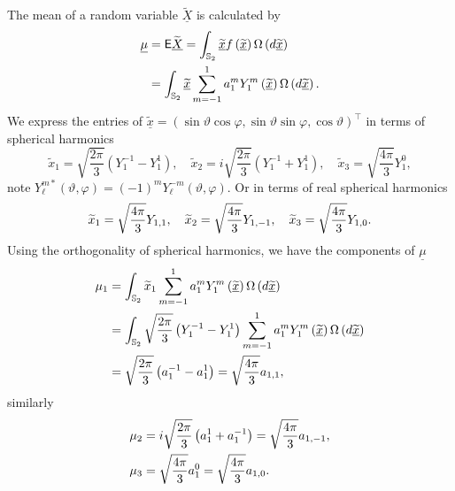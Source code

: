 \documentclass[preprint,11pt,a4paper]{elsarticle}
\begin{document}
The mean of a random variable $\widetilde{\underline{X}}$ is calculated by 
\begin{align}
\underline{\mu} & =\mathsf{E}\widetilde{\underline{X}}=\int_{\mathbb{S}_{2}}%
\underline{\widetilde{x}}f\left( \underline{\widetilde{x}}\right)
\Omega\left( d\underline{\widetilde{x}}\right)  \label{Mean_Dir} \\
& =\int_{\mathbb{S}_{2}}\underline{\widetilde{x}}%
\sum_{m=-1}^{1}a_{1}^{m}Y_{1}^{m}\left( \underline{\widetilde{x}}\right)
\Omega\left( d\underline{\widetilde{x}}\right) .  \notag
\end{align}
We express the entries of $\underline{\widetilde{x}}=\left( \sin\vartheta
\cos\varphi,\sin\vartheta\sin\varphi,\cos\vartheta\right) ^{\top}$ in terms
of spherical harmonics 
\begin{equation}
\widetilde{x}_{1}=\sqrt{\frac{2\pi}{3}}\left( Y_{1}^{-1}-Y_{1}^{1}\right)
,\quad\widetilde{x}_{2}=i\sqrt{\frac{2\pi}{3}}\left(
Y_{1}^{-1}+Y_{1}^{1}\right) ,\quad\widetilde{x}_{3}=\sqrt{\frac{4\pi}{3}}%
Y_{1}^{0},  \label{coord2Sph}
\end{equation}
note $Y_{\ell}^{m\ast}\left( \vartheta,\varphi\right) =\left( -1\right)
^{m}Y_{\ell}^{-m}\left( \vartheta,\varphi\right) $. Or in terms of real
spherical harmonics 
\begin{equation*}
\widetilde{x}_{1}=\sqrt{\frac{4\pi}{3}}Y_{1,1},\quad\widetilde{x}_{2}=\sqrt{%
\frac{4\pi}{3}}Y_{1,-1},\quad\widetilde{x}_{3}=\sqrt{\frac{4\pi}{3}}Y_{1,0}.
\end{equation*}
Using the orthogonality of spherical harmonics, we have the components of $%
\underline{\mu}$ 
\begin{align}
\mu_{1} & =\int_{\mathbb{S}_{2}}\widetilde{x}_{1}%
\sum_{m=-1}^{1}a_{1}^{m}Y_{1}^{m}\left( \underline{\widetilde{x}}\right)
\Omega\left( d\underline{\widetilde{x}}\right)  \notag \\
& =\int_{\mathbb{S}_{2}}\sqrt{\frac{2\pi}{3}}\left(
Y_{1}^{-1}-Y_{1}^{1}\right) \sum_{m=-1}^{1}a_{1}^{m}Y_{1}^{m}\left( 
\underline{\widetilde{x}}\right) \Omega\left( d\underline{\widetilde{x}}%
\right)  \notag \\
& =\sqrt{\frac{2\pi}{3}}\left( a_{1}^{-1}-a_{1}^{1}\right) =\sqrt {\frac{4\pi%
}{3}}a_{1,1},  \label{Mu1}
\end{align}
similarly 
\begin{align}
\mu_{2} & =i\sqrt{\frac{2\pi}{3}}\left( a_{1}^{1}+a_{1}^{-1}\right) =\sqrt{%
\frac{4\pi}{3}}a_{1,-1},  \label{Mu2} \\
\mu_{3} & =\sqrt{\frac{4\pi}{3}}a_{1}^{0}=\sqrt{\frac{4\pi}{3}}a_{1,0}. 
\notag
\end{align}
\end{document}
